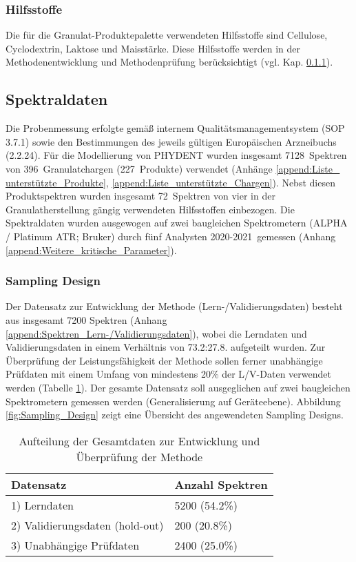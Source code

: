 \documentclass[11pt, a4paper]{article}
\newcommand\AnzahlProdukte{227}
\newcommand\NoSpectraRefLearn{5200 (54.2\%)}
\newcommand\NoSpectraRefVal{200 (20.8\%)}
\newcommand\NoSpectraPruef{2400 (25.0\%)}
\newcommand\NrSpektren{7128}
\newcommand\Granulatchargen{396}
\newcommand\NrMatrix{72}
\newcommand\DateRange{2020-2021}
\begin{document}
\subsubsection{Hilfsstoffe}
\label{sec:Hilfsstoffe}
Die für die Granulat-Produktepalette verwendeten Hilfsstoffe sind Cellulose, Cyclodextrin, Laktose und Maisstärke. Diese Hilfsstoffe werden in der Methodenentwicklung und Methodenprüfung berücksichtigt (vgl. Kap. \ref{sec:Sampling_Design}).

\subsection{Spektraldaten}
Die Probenmessung erfolgte gemäß internem Qualitätsmanagementsystem (SOP 3.7.1) sowie den Bestimmungen des jeweils gültigen Europäischen Arzneibuchs (2.2.24). Für die Modellierung von PHYDENT wurden insgesamt \NrSpektren\ Spektren von \Granulatchargen\ Granulatchargen (\AnzahlProdukte\ Produkte) verwendet (Anhänge \ref{append:Liste_ unterstützte_Produkte}, \ref{append:Liste_unterstützte_Chargen}). Nebst diesen Produktspektren wurden insgesamt \NrMatrix\ Spektren von vier in der Granulatherstellung gängig verwendeten Hilfsstoffen einbezogen. Die Spektraldaten wurden ausgewogen auf zwei baugleichen Spektrometern (ALPHA / Platinum ATR; Bruker) durch fünf Analysten \DateRange\ gemessen (Anhang \ref{append:Weitere_kritische_Parameter}).

\subsubsection{Sampling Design}
\label{sec:Sampling_Design}
Der Datensatz zur Entwicklung der Methode (Lern-/Validierungsdaten) besteht aus insgesamt 7200 Spektren (Anhang \ref{append:Spektren_Lern-/Validierungsdaten}), wobei die Lerndaten und Validierungsdaten in einem Verhältnis von 73.2:27.8. aufgeteilt wurden. Zur Überprüfung der Leistungsfähigkeit der Methode sollen ferner unabhängige Prüfdaten mit einem Umfang von mindestens 20\% der L/V-Daten verwendet werden (Tabelle \ref{tab:Aufteilung_gesamtdaten}). Der gesamte Datensatz soll ausgeglichen auf zwei baugleichen Spektrometern gemessen werden (Generalisierung auf Geräteebene). Abbildung \ref{fig:Sampling_Design} zeigt eine Übersicht des angewendeten Sampling Designs.

\begin{table}
\begin{center}
\begin{tabular}{| m{7cm} | m{7cm}| }
\hline
Datensatz & Anzahl Spektren \\
\hline
1) Lerndaten & \NoSpectraRefLearn \\
\hline
2) Validierungsdaten (hold-out) & \NoSpectraRefVal \\
\hline
3) Unabhängige Prüfdaten & \NoSpectraPruef \\
\hline
\end{tabular}
\end{center}
\caption{Aufteilung der Gesamtdaten zur Entwicklung und Überprüfung der Methode}
\label{tab:Aufteilung_gesamtdaten}
\end{table}
\end{document}
